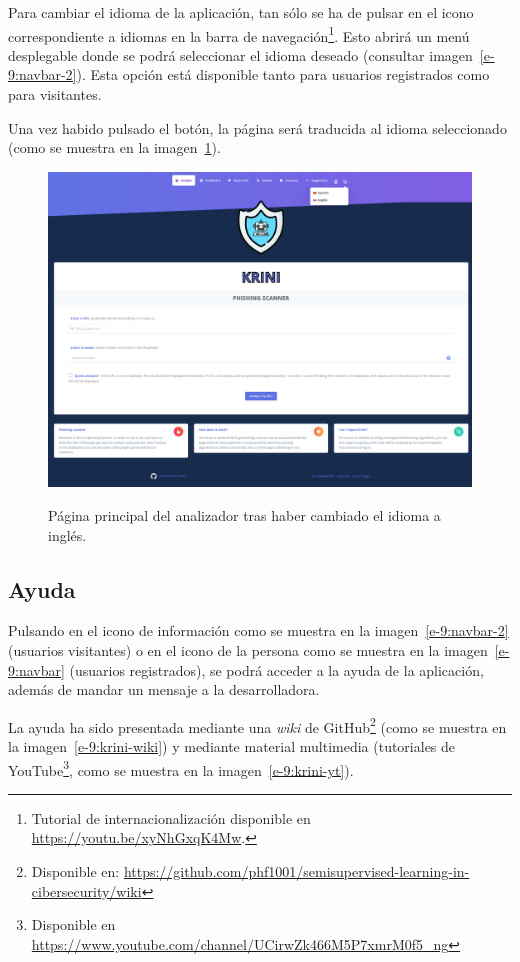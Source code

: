 Para cambiar el idioma de la aplicación, tan sólo se ha de pulsar en el icono correspondiente a idiomas en la barra de navegación\footnote{Tutorial de internacionalización disponible en \url{https://youtu.be/xyNhGxqK4Mw}.}. Esto abrirá un menú desplegable donde se podrá seleccionar el idioma deseado (consultar imagen~\ref{e-9:navbar-2}). Esta opción está disponible tanto para usuarios registrados como para visitantes.

Una vez habido pulsado el botón, la página será traducida al idioma seleccionado (como se muestra en la imagen~\ref{e-9:krini-english}).

\begin{figure}[h]
	\caption[Manual de usuario: página principal (inglés)]{Página principal del analizador tras haber cambiado el idioma a inglés.}
	\centering
	\includegraphics[width=\textwidth]{../img/anexos/user_guide/9_english}
	\label{e-9:krini-english}
\end{figure}


\subsection{Ayuda}

Pulsando en el icono de información como se muestra en la imagen~\ref{e-9:navbar-2} (usuarios visitantes) o en el icono de la persona como se muestra en la imagen~\ref{e-9:navbar} (usuarios registrados), se podrá acceder a la ayuda de la aplicación, además de mandar un mensaje a la desarrolladora.

La ayuda ha sido presentada mediante una \textit{wiki} de GitHub\footnote{Disponible en: \url{https://github.com/phf1001/semisupervised-learning-in-cibersecurity/wiki}} (como se muestra en la imagen~\ref{e-9:krini-wiki}) y mediante material multimedia (tutoriales de YouTube\footnote{Disponible en \url{https://www.youtube.com/channel/UCirwZk466M5P7xmrM0f5_ng}}, como se muestra en la imagen~\ref{e-9:krini-yt}).

